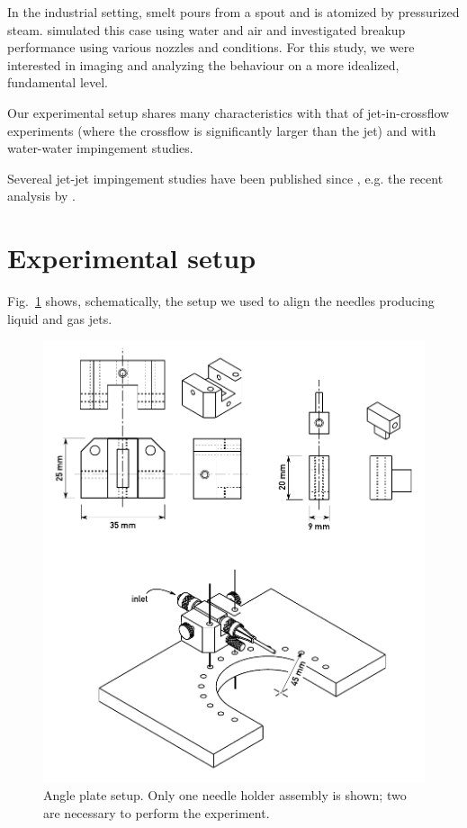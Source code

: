 \documentclass[11.5pt]{book}
\newcommand*{\figref}[1]{Fig.~\ref{#1}}
\begin{document}
In the industrial setting, smelt pours from a spout and is atomized by pressurized steam.
\citet{Taranenko13} simulated this case using water and air and investigated
breakup performance using various nozzles and conditions. For this study, we
were interested in imaging and analyzing the behaviour on a more idealized,
fundamental level.

Our experimental setup shares many characteristics with that of jet-in-crossflow
experiments (where the crossflow is significantly larger than the jet) and with
water-water impingement studies.

Severeal jet-jet impingement studies have been published since
\citet{Dombrowski64}, e.g. the recent analysis by \citet{Li06}.

\section{Experimental setup}
\figref{fig:angle-plate} shows, schematically, the setup we used to align the
needles producing liquid and gas jets.
\begin{figure}
    \centering
    \includegraphics[width=\textwidth]{img/setup/angleplate.pdf}
    \caption{Angle plate setup. Only one needle holder assembly is shown; two
    are necessary to perform the experiment. \label{fig:angle-plate}}
\end{figure}






\end{document}
